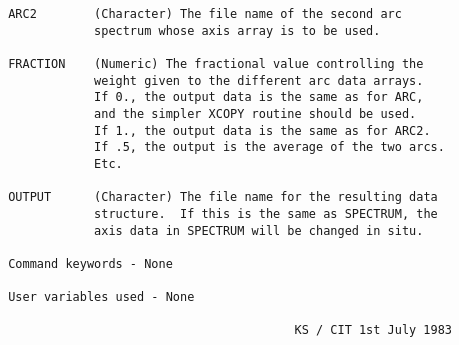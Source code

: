 \begin{description}
\begin{verbatim}
 ARC2        (Character) The file name of the second arc
             spectrum whose axis array is to be used.

 FRACTION    (Numeric) The fractional value controlling the
             weight given to the different arc data arrays.
             If 0., the output data is the same as for ARC,
             and the simpler XCOPY routine should be used.
             If 1., the output data is the same as for ARC2.
             If .5, the output is the average of the two arcs.
             Etc.

 OUTPUT      (Character) The file name for the resulting data
             structure.  If this is the same as SPECTRUM, the
             axis data in SPECTRUM will be changed in situ.

 Command keywords - None

 User variables used - None

                                         KS / CIT 1st July 1983
\end{verbatim}
\end{description}
